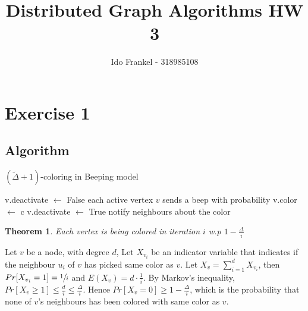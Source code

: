 \documentclass[11pt]{article}
\newcommand*\Let[2]{\State #1 $\gets$ #2}
\newtheorem{theorem}{Theorem}[section]
\begin{document}
\author{Ido Frankel - 318985108}
\title{Distributed Graph Algorithms HW 3}
\maketitle

\medskip


\section{Exercise 1}

\subsection{Algorithm}

\begin{algorithm}
  \caption{$(\tilde{\Delta} + 1)$-coloring in Beeping model}
  \begin{algorithmic}[1]
    \Statex
        \Let{v.deactivate}{False} 
                \State each active vertex $v$ sends a beep with probability 
                    \Let{v.color}{c}
                    \Let{v.deactivate}{True}
                    \State notify neighbours about the color 
                    \State {}            
                \EndIf
            \EndFor
        \EndFor
    \EndFunction
  \end{algorithmic}
\end{algorithm}

\begin{theorem}
\label{vertex_colored_itertaion_i}
Each vertex is being colored in iteration $i$ w.p $1 - \frac{\Delta}{i}$
\end{theorem}
Let $v$ be a node, with degree $d$, Let $X_{v_i}$ be an indicator variable that indicates if the neighbour $u_i$ of $v$ has picked same color as $v$. Let $X_v=\sum_{i=1}^{d}X_{v_i}$, then $Pr[X_{v_i}=1]=\sfrac{1}{i}$ and $E(X_v)= d \cdot \frac{1}{i} $. By Markov's inequality, $Pr[X_v \ge 1] \le \frac{d}{i} \le \frac{\Delta}{i}$. Hence $Pr[X_v = 0] \ge 1 - \frac{\Delta}{i}$, which is the probability that none of $v$'s neighbours has been colored with same color as $v$.
\end{document}
